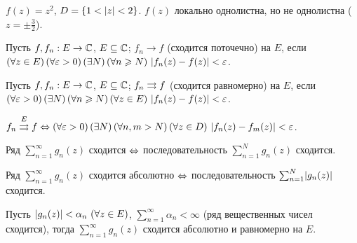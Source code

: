 \begin{example}
	$f(z) = z^2$, $D = \{ 1 < \mathopen{}\left\lvert z\right\rvert\mathclose{} < 2 \}$. $f(z)$ локально однолистна, но не однолистна ($z = \pm \frac{3}{2}$).
\end{example}

\begin{definition}
	Пусть $f, f_n: E \to \mathbb{C}$, $E \subseteq \mathbb{C}$; $f_n \to f$ (сходится поточечно) на $E$, если $(\forall z \in E) \, (\forall \varepsilon > 0) \, (\exists N) \, (\forall n \geqslant N) \,\, \mathopen{}\left\lvert f_n(z) - f(z)\right\rvert\mathclose{} < \varepsilon$. %
\end{definition}

\begin{definition}
	Пусть $f, f_n: E \to \mathbb{C}$, $E \subseteq \mathbb{C}$; $f_n \rightrightarrows f$ (сходится равномерно) на $E$, если $(\forall \varepsilon > 0) \, (\exists N) \, (\forall n \geqslant N) \, (\forall z \in E) \,\, \mathopen{}\left\lvert f_n(z) - f(z)\right\rvert\mathclose{} < \varepsilon$. %
\end{definition}

\begin{theorem} %
	$f_n \overset{E}{\rightrightarrows} f \Leftrightarrow (\forall \varepsilon > 0) \, (\exists N) \, (\forall n, m > N) \, (\forall z \in D) \,\, \mathopen{}\left\lvert f_n(z) - f_m(z)\right\rvert\mathclose{} < \varepsilon$.
\end{theorem}

\begin{definition}
	Ряд $\sum_{n = 1}^\infty g_n(z)$ сходится $\Leftrightarrow$ последовательность $\sum_{n = 1}^N g_n(z)$ сходится. %
\end{definition}

\begin{definition}
	Ряд $\sum_{n = 1}^\infty g_n(z)$ сходится абсолютно $\Leftrightarrow$ последовательность $\sum_{n = 1}^N \mathopen{}\left\lvert g_n(z)\right\rvert\mathclose{}$ сходится. %
\end{definition}

\begin{theorem}
	Пусть $\mathopen{}\left\lvert g_n(z)\right\rvert\mathclose{} < \alpha_n \,\, (\forall z \in E)$, $\sum_{n = 1}^\infty \alpha_n < \infty$ (ряд вещественных чисел сходится), тогда $\sum_{n = 1}^\infty g_n(z)$ сходится абсолютно и равномерно на $E$.
\end{theorem}

